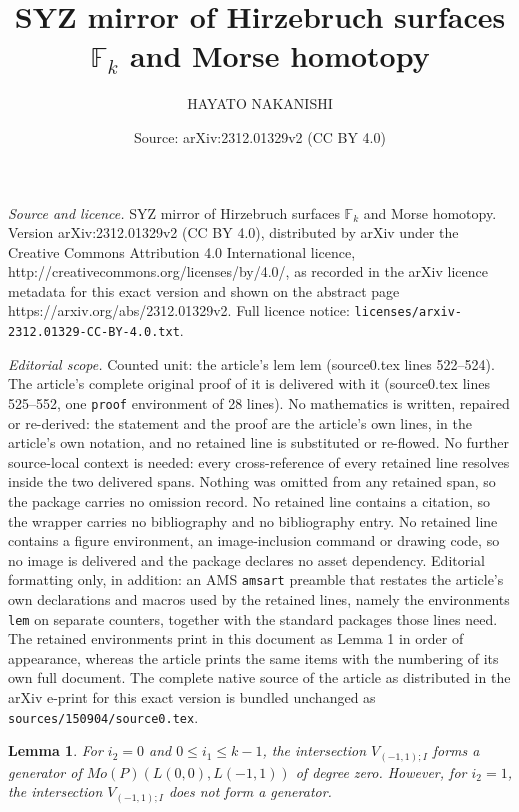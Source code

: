 \documentclass[10pt,a4paper]{amsart}
\title{SYZ mirror of Hirzebruch surfaces $\mathbb{F}_k$ and Morse homotopy}
\author{HAYATO NAKANISHI}
\date{Source: arXiv:2312.01329v2 (CC BY 4.0)}
\newtheorem{lem}{Lemma}
\begin{document}
\maketitle

\noindent\emph{Source and licence.} SYZ mirror of Hirzebruch surfaces $\mathbb{F}_k$ and Morse homotopy. Version arXiv:2312.01329v2 (CC BY 4.0), distributed by arXiv under the Creative Commons Attribution 4.0 International licence, http://creativecommons.org/licenses/by/4.0/, as recorded in the arXiv licence metadata for this exact version and shown on the abstract page https://arxiv.org/abs/2312.01329v2. Full licence notice: \texttt{licenses/arxiv-2312.01329-CC-BY-4.0.txt}.\par\smallskip

\noindent\textit{Editorial scope.} Counted unit: the article's lem lem (source0.tex lines 522--524). The article's complete original proof of it is delivered with it (source0.tex lines 525--552, one \texttt{proof} environment of 28 lines). No mathematics is written, repaired or re-derived: the statement and the proof are the article's own lines, in the article's own notation, and no retained line is substituted or re-flowed.  No further source-local context is needed: every cross-reference of every retained line resolves inside the two delivered spans.  Nothing was omitted from any retained span, so the package carries no omission record.  No retained line contains a citation, so the wrapper carries no bibliography and no bibliography entry.  No retained line contains a figure environment, an image-inclusion command or drawing code, so no image is delivered and the package declares no asset dependency.  Editorial formatting only, in addition: an AMS \texttt{amsart} preamble that restates the article's own declarations and macros used by the retained lines, namely the environments \texttt{lem} on separate counters, together with the standard packages those lines need.  The retained environments print in this document as Lemma 1 in order of appearance, whereas the article prints the same items with the numbering of its own full document.  The complete native source of the article as distributed in the arXiv e-print for this exact version is bundled unchanged as \texttt{sources/150904/source0.tex}.
\begin{lem}
For $i_2=0$ and $0\leq i_1\leq k-1$, the intersection $V_{(-1,1);I}$ forms a generator of $Mo(P)(L(0,0),L(-1,1))$ of degree zero. However, for $i_2=1$, the intersection $V_{(-1,1);I}$ does not form a generator.
\end{lem}
\end{document}
